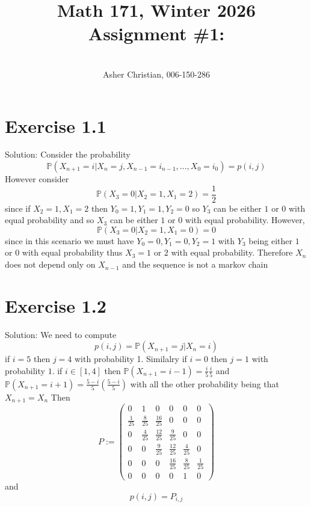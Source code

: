 \documentclass[11pt]{article}
\newcommand{\cnum}{Math 171}
\newcommand{\ced}{Winter 2026}
\newcommand{\ctitle}[4]{\title{\vspace{-0.5in}\cnum, \ced\\Assignment #1: #2}\author{\vspace{-0.35in}\\#3, #4}}
\newcommand{\solution}[1]{{{\textcolor{header}{Solution:} \textcolor{solution}{#1}}}}
\begin{document}
\ctitle{\#1}{}{Asher Christian}{006-150-286}
\date{}
\maketitle

\section{Exercise 1.1}
\solution{
    Consider the probability
    \[
        \mathbb{P}(X_{n+1} = i | X_{n} = j, X_{n-1} = i_{n-1}, \dots, X_0 = i_0) = p(i,j)
    \] 
    However consider
    \[
    \mathbb{P}(X_3 = 0 | X_2 = 1, X_1 = 2) = \frac{1}{2}
    \] 
    since if $X_2 = 1, X_1 = 2$ then $Y_0 = 1, Y_1 = 1, Y_2 = 0$ so $Y_3$ can be either $1$ or  $0$ with equal probability
    and so  $X_3$ can be either $1$ or  $0$ with equal probability. However,
    \[
    \mathbb{P}(X_3 = 0 | X_2 = 1, X_1 = 0) = 0
    \] 
    since in this scenario we must have $Y_0 = 0, Y_1 = 0, Y_2 = 1$ with $Y_3$ being either $1$ or $0$ with equal probability thus
    $X_3 = 1 $ or $2$ with equal probability. Therefore  $X_n$ does not depend only on  $X_{n-1}$ and the sequence is not a markov chain
}

\section{Exercise 1.2}
\solution{
    We need to compute
    \[
        p(i,j) = \mathbb{P}(X_{n+1} = j | X_n = i)
    \] 
    if $i = 5$ then  $j = 4$ with probability 1. Similalry if  $i=0$ then  $j=1$ with probability  $1$.
    if $i \in [1,4]$ then  $ \mathbb{P}(X_{n+1} =i-1) = \frac{i}{5}\frac{i}{5}$ and $ \mathbb{P}(X_{n+1} = i+1) = \frac{5-i}{5}(\frac{5-i}{5})$ with all the other probability being that $X_{n+1} = X_n$
    Then
    \[
    P :=
    \begin{pmatrix} 0 & 1 & 0 & 0 & 0 & 0\\
    \frac{1}{25} & \frac{8}{25} & \frac{16}{25} & 0 & 0 & 0 \\
    0 & \frac{4}{25} & \frac{12}{25} & \frac{9}{25} & 0 & 0\\
    0 & 0 & \frac{9}{25} & \frac{12}{25} & \frac{4}{25} & 0\\
    0 & 0 & 0 & \frac{16}{25} & \frac{8}{25} & \frac{1}{25}\\
    0 & 0 & 0 & 0 & 1 & 0
    \end{pmatrix} 
    \] 
    and
    \[
        p(i,j) = P_{i,j}
    \] 
}
\end{document}
